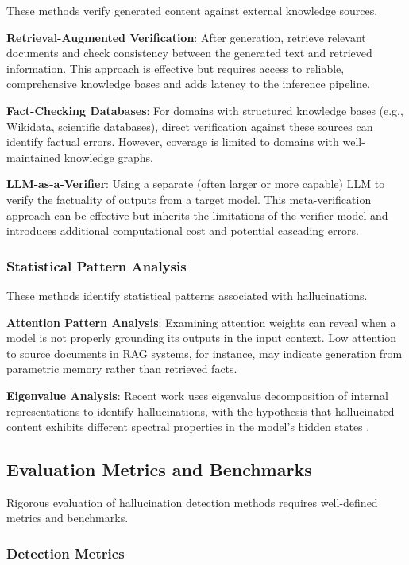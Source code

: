 These methods verify generated content against external knowledge sources.

\textbf{Retrieval-Augmented Verification}: After generation, retrieve relevant documents and check consistency between the generated text and retrieved information. This approach is effective but requires access to reliable, comprehensive knowledge bases and adds latency to the inference pipeline.

\textbf{Fact-Checking Databases}: For domains with structured knowledge bases (e.g., Wikidata, scientific databases), direct verification against these sources can identify factual errors. However, coverage is limited to domains with well-maintained knowledge graphs.

\textbf{LLM-as-a-Verifier}: Using a separate (often larger or more capable) LLM to verify the factuality of outputs from a target model. This meta-verification approach can be effective but inherits the limitations of the verifier model and introduces additional computational cost and potential cascading errors.

\subsubsection{Statistical Pattern Analysis}

These methods identify statistical patterns associated with hallucinations.

\textbf{Attention Pattern Analysis}: Examining attention weights can reveal when a model is not properly grounding its outputs in the input context. Low attention to source documents in RAG systems, for instance, may indicate generation from parametric memory rather than retrieved facts.

\textbf{Eigenvalue Analysis}: Recent work uses eigenvalue decomposition of internal representations to identify hallucinations, with the hypothesis that hallucinated content exhibits different spectral properties in the model's hidden states \citep{huang2023survey}.

\subsection{Evaluation Metrics and Benchmarks}

Rigorous evaluation of hallucination detection methods requires well-defined metrics and benchmarks.

\subsubsection{Detection Metrics}

